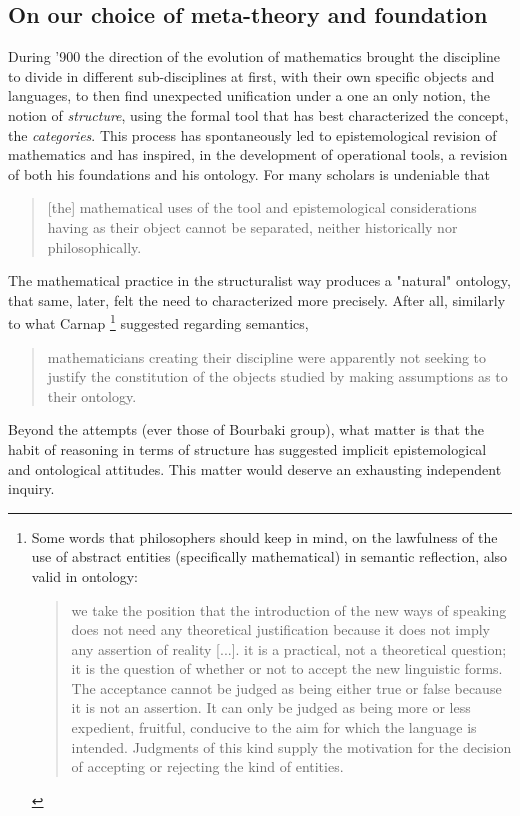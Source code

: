 \subsection{On our choice of meta-theory and foundation}
During '900 the direction of the evolution of mathematics brought the discipline to divide in different sub-disciplines at first, with their own specific objects and languages, to then find unexpected unification under a one an only notion, the notion of \emph{structure}, using the formal tool that has best characterized the concept, the \emph{categories}. This process has spontaneously led to epistemological revision of mathematics and has inspired, in the development of operational tools, a revision of both his foundations and his ontology. For many scholars is undeniable that

\begin{quote}
	[the] mathematical uses of the tool \CT and epistemological
	considerations having \CT as their object cannot be separated, neither historically
	nor philosophically. \cite{kromer2007tool}
\end{quote}
The mathematical practice in the structuralist way produces a "natural" ontology, that same, later, felt the need to characterized more precisely. After all, similarly to what Carnap \footnote{Some words that philosophers should keep in mind, on the lawfulness of the use of abstract entities (specifically mathematical) in semantic reflection, also valid in ontology:
	\begin{quote}
		we take the position that the introduction of the new ways of speaking does not need any theoretical justification because it does not imply any assertion of reality [...].  it is a practical, not a theoretical question; it is the question of whether or not to accept the new linguistic forms. The acceptance cannot be judged as being either true or false because it is not an assertion. It can only be judged as being more or less expedient, fruitful, conducive to the aim for which the language is intended. Judgments of this kind supply the motivation for the decision of accepting or rejecting the kind of entities. \hfill \cite{carnap1956meaning}
	\end{quote}} suggested regarding semantics,

\begin{quote}
	mathematicians creating their discipline were apparently not seeking to justify the constitution of the	objects studied by making assumptions as to their ontology.\hfill  \cite{kromer2007tool}
\end{quote}
Beyond the attempts (ever those of Bourbaki group), what matter is that the habit of reasoning in terms of structure has suggested implicit epistemological and ontological attitudes. This matter would deserve an exhausting independent inquiry.

